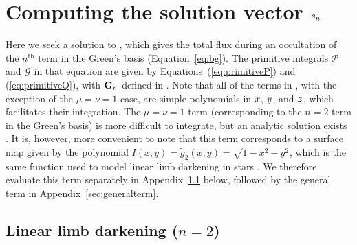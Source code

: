 \documentclass[modern]{aastex61}
\begin{document}
\section{Computing the solution vector $\MakeLowercase{s_n}$}
\label{sec:solutionvector}

Here we seek a solution to , which gives the total flux
during an occultation of the $n^\mathrm{th}$ term in the Green's basis
(Equation~\ref{eq:bg}). The primitive integrals $\mathcal{P}$ and
$\mathcal{G}$ in that equation are given by Equations~(\ref{eq:primitiveP})
and (\ref{eq:primitiveQ}), with
${\mathbf{G}}_n$ defined in . Note that all of the terms in ,
with the exception of the $\mu = \nu = 1$ case, are simple polynomials
in $\mbox{$x$}$, $\mbox{$y$}$, and $\mbox{$z$}$, which facilitates their integration.
The $\mu = \nu = 1$ term (corresponding to the $n = 2$ term in the Green's basis)
is more difficult to integrate, but an analytic
solution exists \citep{Pal2012}. It is, however, more convenient
to note that this term corresponds to a surface map given by the polynomial
$I(x, y) = \tilde{g}_2(x, y) = \sqrt{1 - x^2 - y^2}$, which is the same function used
to model linear limb darkening in stars \citep{MandelAgol2002}. We therefore
evaluate this term separately in Appendix~\ref{sec:linearld} below, followed by
the general term in Appendix~\ref{sec:generalterm}.

\subsection{Linear limb darkening ($n = 2$)}
\label{sec:linearld}
\end{document}
